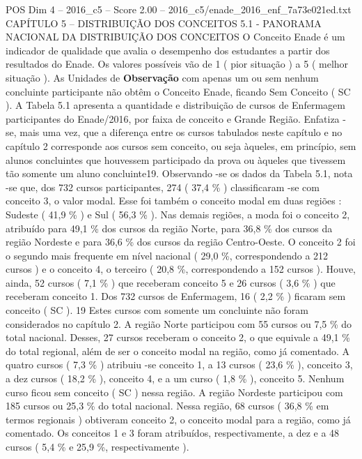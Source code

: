 \begin{textsample}{POS Dim 4 – 2016\_c5 – Score 2.00 – 2016\_c5/enade\_2016\_enf\_7a73e021ed.txt}  \label{ex:f4_pos_102}
CAPÍTULO 5 – DISTRIBUIÇÃO DOS CONCEITOS 5.1 - PANORAMA NACIONAL DA DISTRIBUIÇÃO DOS CONCEITOS O Conceito Enade é um indicador de qualidade que avalia o desempenho dos estudantes a partir dos resultados do Enade.
Os valores possíveis vão de 1 ( pior situação ) a 5 ( melhor situação ).
As Unidades de \textbf{Observação} com apenas um ou sem nenhum concluinte participante não obtêm o Conceito Enade, ficando Sem Conceito ( SC ).
A Tabela 5.1 apresenta a quantidade e distribuição de cursos de Enfermagem participantes do Enade/2016, por faixa de conceito e Grande Região.
Enfatiza -se, mais uma vez, que a diferença entre os cursos tabulados neste capítulo e no capítulo 2 corresponde aos cursos sem conceito, ou seja àqueles, em princípio, sem alunos concluintes que houvessem participado da prova ou àqueles que tivessem tão somente um aluno concluinte19.
Observando -se os dados da Tabela 5.1, nota -se que, dos 732 cursos participantes, 274 ( 37,4 \% ) classificaram -se com conceito 3, o valor modal.
Esse foi também o conceito modal em duas regiões : Sudeste ( 41,9 \% ) e Sul ( 56,3 \% ).
Nas demais regiões, a moda foi o conceito 2, atribuído para 49,1 \% dos cursos da região Norte, para 36,8 \% dos cursos da região Nordeste e para 36,6 \% dos cursos da região Centro-Oeste.
O conceito 2 foi o segundo mais frequente em nível nacional ( 29,0 \%, correspondendo a 212 cursos ) e o conceito 4, o terceiro ( 20,8 \%, correspondendo a 152 cursos ).
Houve, ainda, 52 cursos ( 7,1 \% ) que receberam conceito 5 e 26 cursos ( 3,6 \% ) que receberam conceito 1.
Dos 732 cursos de Enfermagem, 16 ( 2,2 \% ) ficaram sem conceito ( SC ). 19 Estes cursos com somente um concluinte não foram considerados no capítulo 2.
A região Norte participou com 55 cursos ou 7,5 \% do total nacional.
Desses, 27 cursos receberam o conceito 2, o que equivale a 49,1 \% do total regional, além de ser o conceito modal na região, como já comentado.
A quatro cursos ( 7,3 \% ) atribuiu -se conceito 1, a 13 cursos ( 23,6 \% ), conceito 3, a dez cursos ( 18,2 \% ), conceito 4, e a um curso ( 1,8 \% ), conceito 5.
Nenhum curso ficou sem conceito ( SC ) nessa região.
A região Nordeste participou com 185 cursos ou 25,3 \% do total nacional.
Nessa região, 68 cursos ( 36,8 \% em termos regionais ) obtiveram conceito 2, o conceito modal para a região, como já comentado.
Os conceitos 1 e 3 foram atribuídos, respectivamente, a dez e a 48 cursos ( 5,4 \% e 25,9 \%, respectivamente ).

\end{textsample}

